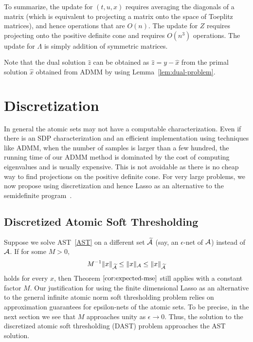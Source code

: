 To summarize, the update for $(t,u,x)$ requires averaging the diagonals of a
matrix (which is equivalent to projecting a matrix onto the space of Toeplitz
matrices), and hence operations that are $O(n)$. The update for $Z$ requires
projecting onto the positive definite cone and requires $O(n^3)$ operations. The
update for $\Lambda$ is simply addition of symmetric matrices.

Note that the dual solution $\hat{z}$ can be obtained as $\hat{z} = y - \hat{x}$
from the primal solution $\hat{x}$ obtained from ADMM by using
Lemma~\ref{lem:dual-problem}.

\section{Discretization}

In general the atomic sets may not have a computable characterization. Even if
there is an SDP characterization and an efficient implementation using
techniques like ADMM, when the number of samples is larger than a few hundred,
the running time of our ADMM method is dominated by the cost of computing
eigenvalues and is usually expensive. This is not avoidable as there is no cheap
way to find projections on the positive definite cone. For very large problems,
we now propose using discretization and hence Lasso as an alternative to the
semidefinite program~.

\subsection{Discretized Atomic Soft Thresholding} %
\label{sub:discretized_atomic_soft_thresholding}

Suppose we solve AST~\eqref{AST} on a different set $\widetilde{\mathcal{A}}$ (say, an
$\epsilon$-net of $\mathcal{A}$) instead of $\mathcal{A}$. If for some $M>0,$ \[
M^{-1}\lVert x\rVert_{\widetilde{\mathcal{A}}} \leq \lVert x\rVert_{\mathcal{A}} \leq
\lVert x\rVert_{\widetilde{\mathcal{A}}} \] holds for every $x$, then Theorem
$\ref{cor:expected-mse}$ still applies with a constant factor $M$. Our
justification for using the finite dimensional Lasso as an alternative to the
general infinite atomic norm soft thresholding problem relies on approximation
guarantees for epsilon-nets of the atomic sets. To be precise, in the next
section we see that $M$ approaches unity as $\epsilon \to 0.$ Thus, the solution
to the discretized atomic soft thresholding (DAST) problem approaches the AST
solution.

